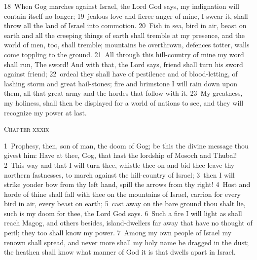 \documentclass[10pt]{book} %
\begin{document}
\textcolor{benred8}{18}~When Gog marches against Israel, the Lord God says, my indignation will contain itself no longer; \textcolor{benred8}{19}~jealous love and fierce anger of mine, I swear it, shall throw all the land of Israel into commotion. \textcolor{benred8}{20}~Fish in sea, bird in air, beast on earth and all the creeping things of earth shall tremble at my presence, and the world of men, too, shall tremble; mountains be overthrown, defences totter, walls come toppling to the ground. \textcolor{benred8}{21}~All through this hill-country of mine my word shall run, The sword! And with that, the Lord says, friend shall turn his sword against friend; \textcolor{benred8}{22}~ordeal they shall have of pestilence and of blood-letting, of lashing storm and great hail-stones; fire and brimstone I will rain down upon them, all that great army and the hordes that follow with it. \textcolor{benred8}{23}~My greatness, my holiness, shall then be displayed for a world of nations to see, and they will recognize my power at last.
\begin{large}\begin{center}\textsc{Chapter xxxix}\end{center}\end{large}
\textcolor{benred8}{1}~Prophesy, then, son of man, the doom of Gog; be this the divine message thou givest him: Have at thee, Gog, that hast the lordship of Mosoch and Thubal! \textcolor{benred8}{2}~This way and that I will turn thee, whistle thee on and bid thee leave thy northern fastnesses, to march against the hill-country of Israel; \textcolor{benred8}{3}~then I will strike yonder bow from thy left hand, spill the arrows from thy right! \textcolor{benred8}{4}~Host and horde of thine shall fall with thee on the mountains of Israel, carrion for every bird in air, every beast on earth; \textcolor{benred8}{5}~cast away on the bare ground thou shalt lie, such is my doom for thee, the Lord God says. \textcolor{benred8}{6}~Such a fire I will light as shall reach Magog, and others besides, island-dwellers far away that have no thought of peril; they too shall know my power. \textcolor{benred8}{7}~Among my own people of Israel my renown shall spread, and never more shall my holy name be dragged in the dust; the heathen shall know what manner of God it is that dwells apart in Israel.
\end{document}
